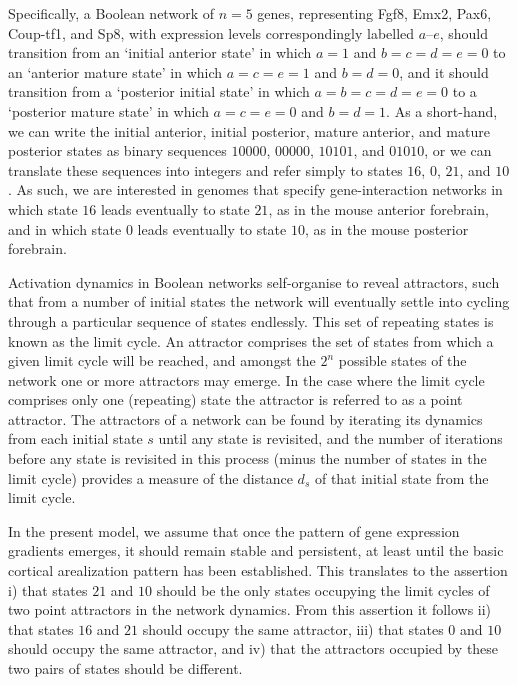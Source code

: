 \documentclass[10pt,letterpaper]{article}
\begin{document}
Specifically, a Boolean network of $n=5$ genes, representing Fgf8, Emx2, Pax6, Coup-tf1, and Sp8, with expression levels correspondingly labelled $a$--$e$, should transition from an `initial anterior state' in which $a=1$ and $b=c=d=e=0$ to an `anterior mature state' in which $a=c=e=1$ and $b=d=0$, and it should transition from a `posterior initial state' in which $a=b=c=d=e=0$ to a `posterior mature state' in which $a=c=e=0$ and $b=d=1$. As a short-hand, we can write the initial anterior, initial posterior, mature anterior, and mature posterior states as binary sequences $10000$, $00000$, $10101$, and $01010$, or we can translate these sequences into integers
 and refer simply to states $16$, $0$, $21$, and $10$. As such, we are interested in genomes that specify gene-interaction networks in which state $16$ leads eventually to state $21$, as in the mouse anterior forebrain, and in which state $0$ leads eventually to state $10$, as in the mouse posterior forebrain.

Activation dynamics in Boolean networks self-organise to reveal attractors, such that from a number of initial states the network will eventually settle into cycling through a particular sequence of states endlessly. This set of repeating states is known as the limit cycle. An attractor comprises the set of states from which a given limit cycle will be reached, and amongst the $2^n$ possible states of the network one or more attractors may emerge. In the case where the limit cycle comprises only one (repeating) state the attractor is referred to as a point attractor. The attractors of a network can be found by iterating its dynamics from each initial state $s$ until any state is revisited, and the number of iterations before any state is revisited in this process (minus the number of states in the limit cycle) provides a measure of the distance $d_s$ of that initial state from the limit cycle.

In the present model, we assume that once the pattern of gene expression gradients emerges, it should remain stable and persistent, at least until the basic cortical arealization pattern has been established. This translates to the assertion i) that states $21$ and $10$ should be the only states occupying the limit cycles of two point attractors in the network dynamics. From this assertion it follows ii) that states $16$ and $21$ should occupy the same attractor, iii) that states $0$ and $10$ should occupy the same attractor, and iv) that the attractors occupied by these two pairs of states should be different.
\end{document}
